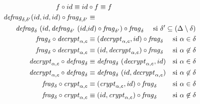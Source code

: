 \documentclass[french]{article}
\begin{document}
\begin{align}
	f \circ id \equiv id &\circ f \equiv f
	\label{eq:law-cmp-id}\\
	\defrag{\delta, \delta'} (id, id, id) \circ \frag{\delta, \delta'}
	&\equiv\nonumber\span\span\\
	\defrag{\delta}\ (id, \defrag{\delta'}\ (id, &id)
	\circ \frag{\delta'}) \circ \frag{\delta}
	\quad\,\,\text{si $\delta' \subseteq (\Delta \setminus \delta)$}
	\span\span
	\label{eq:law-cmp-frag}\\
	\frag{\delta} \circ \decrypt{c}{\alpha}
	&\equiv (\decrypt{c}{\alpha}, id) \circ \frag{\delta}
	&\text{si $\alpha \in \delta$}
	\label{eq:law-cmp-fgcr1}\\
	\frag{\delta} \circ \decrypt{c}{\alpha}
	&\equiv (id, \decrypt{c}{\alpha}) \circ \frag{\delta}
	&\text{si $\alpha \not\in \delta$}
	\label{eq:law-cmp-fgcr2}\\
	\decrypt{c}{\alpha} \circ \defrag{\delta}
	&\equiv \defrag{\delta}\ (\decrypt{c}{\alpha}, id)
	&\text{si $\alpha \in \delta$}
	\label{eq:law-cmp-crfg1}\\
	\decrypt{c}{\alpha} \circ \defrag{\delta}
	&\equiv \defrag{\delta}\ (id, \decrypt{c}{\alpha})
	&\text{si $\alpha \not\in \delta$}
	\label{eq:law-cmp-crfg2}\\
	\frag{\delta} \circ \crypt{c}{\alpha}
	&\equiv (\crypt{c}{\alpha}, id) \circ \frag{\delta}
	&\text{si $\alpha \in \delta$}
	\label{eq:law-cmp-fgcr3}\\
	\frag{\delta} \circ \crypt{c}{\alpha}
	&\equiv (id, \crypt{c}{\alpha}) \circ \frag{\delta}
	&\text{si $\alpha \not\in \delta$}
	\label{eq:law-cmp-fgcr4}
\end{align}
\end{document}
